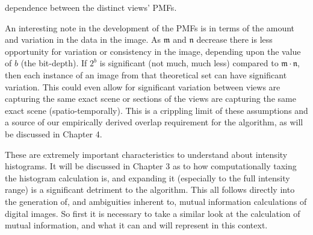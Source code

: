 dependence between the distinct views' PMFs.


An interesting note in the development of the PMFs is in terms of the amount and variation in the data in the image. As $\mathfrak{m}$ and $\mathfrak{n}$ decrease there is less opportunity for variation or consistency in the image, depending upon the value of $b$ (the bit-depth). If $2^{b}$ is significant (\ie not much, much less) compared to $\mathfrak{m} \cdot \mathfrak{n}$, then each instance of an image from that theoretical set can have significant variation. This could even allow for significant variation between views are capturing the same exact scene or sections of the views are capturing the same exact scene (spatio-temporally). This is a crippling limit of these assumptions and a source of our empirically derived overlap requirement for the algorithm, as will be discussed in Chapter 4.


These are extremely important characteristics to understand about intensity histograms. It will be discussed in Chapter 3 as to how computationally taxing the histogram calculation is, and expanding it (especially to the full intensity range) is a significant detriment to the algorithm. This all follows directly into the generation of, and ambiguities inherent to, mutual information calculations of digital images. So first it is necessary to take a similar look at the calculation of mutual information, and what it can and will represent in this context.



